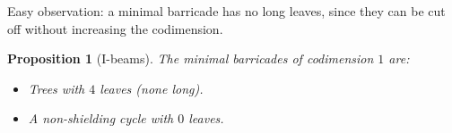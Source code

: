 \documentclass{amsart}
\newtheorem{prop}[proposition]{Proposition}
\theoremstyle{definition}
\newtheorem{definition}[proposition]{Definition}
\theoremstyle{remark}
\numberwithin{equation}{section}
\newcommand{\newword}[1]{\textbf{\emph{#1}}}
\newcommand{\0}{{\mathbf{0}}}
\newcommand{\M}{\mathcal{M}}
\renewcommand{\S}{\mathbf{S}}
\begin{document}
Easy observation: a minimal barricade has no long leaves, since they can be cut off without increasing the codimension.


\begin{prop}[I-beams]
The minimal barricades of codimension $1$ are:
\begin{itemize}
	\item Trees with $4$ leaves (none long).
	\item A non-shielding cycle with $0$ leaves.
\end{itemize}
\end{prop}

\end{document}
